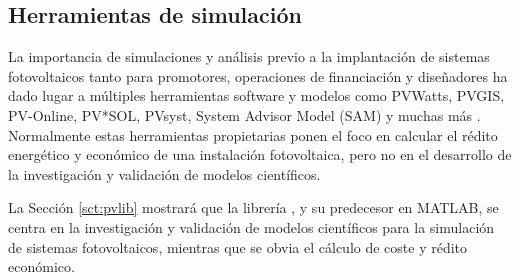 \subsection{Herramientas de simulación}

La importancia de simulaciones y análisis previo a la implantación de sistemas fotovoltaicos tanto para promotores, operaciones de financiación y diseñadores ha dado lugar a múltiples herramientas \gls{software} y modelos como PVWatts, PVGIS, PV-Online, PV*SOL, PVsyst, System Advisor Model (SAM) y muchas más \cite{stein_models_2009, Kumar_2017}. Normalmente estas herramientas propietarias ponen el foco en calcular el rédito energético y económico de una instalación fotovoltaica, pero no en el desarrollo de la investigación y validación de modelos científicos.

La Sección \ref{sct:pvlib} mostrará que la librería \pvlibpy{}, y su predecesor en \gls{MATLAB}, se centra en la investigación y validación de modelos científicos para la simulación de sistemas fotovoltaicos, mientras que se obvia el cálculo de coste y rédito económico.
